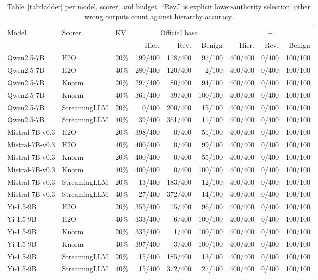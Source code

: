 \begin{table}[t]
\centering
\scriptsize
\setlength{\tabcolsep}{2.6pt}
\begin{tabular}{lllrrrrrr}
\toprule
Model & Scorer & KV & \multicolumn{3}{c}{Official base} & \multicolumn{3}{c}{+\method{}} \\
\cmidrule(lr){4-6}\cmidrule(lr){7-9}
& & & Hier. & Rev. & Benign & Hier. & Rev. & Benign \\
\midrule
Qwen2.5-7B & H2O & 20\% & 199/400 & 118/400 & 97/100 & 400/400 & 0/400 & 100/100 \\
Qwen2.5-7B & H2O & 40\% & 280/400 & 120/400 & 2/100 & 400/400 & 0/400 & 100/100 \\
Qwen2.5-7B & Knorm & 20\% & 297/400 & 80/400 & 94/100 & 400/400 & 0/400 & 100/100 \\
Qwen2.5-7B & Knorm & 40\% & 361/400 & 39/400 & 100/100 & 400/400 & 0/400 & 100/100 \\
Qwen2.5-7B & StreamingLLM & 20\% & 0/400 & 200/400 & 15/100 & 400/400 & 0/400 & 100/100 \\
Qwen2.5-7B & StreamingLLM & 40\% & 39/400 & 361/400 & 11/100 & 400/400 & 0/400 & 100/100 \\
\midrule
Mistral-7B-v0.3 & H2O & 20\% & 398/400 & 0/400 & 51/100 & 400/400 & 0/400 & 100/100 \\
Mistral-7B-v0.3 & H2O & 40\% & 400/400 & 0/400 & 99/100 & 400/400 & 0/400 & 100/100 \\
Mistral-7B-v0.3 & Knorm & 20\% & 400/400 & 0/400 & 55/100 & 400/400 & 0/400 & 100/100 \\
Mistral-7B-v0.3 & Knorm & 40\% & 400/400 & 0/400 & 100/100 & 400/400 & 0/400 & 100/100 \\
Mistral-7B-v0.3 & StreamingLLM & 20\% & 13/400 & 183/400 & 12/100 & 400/400 & 0/400 & 100/100 \\
Mistral-7B-v0.3 & StreamingLLM & 40\% & 27/400 & 372/400 & 14/100 & 400/400 & 0/400 & 100/100 \\
\midrule
Yi-1.5-9B & H2O & 20\% & 355/400 & 15/400 & 96/100 & 400/400 & 0/400 & 100/100 \\
Yi-1.5-9B & H2O & 40\% & 333/400 & 6/400 & 100/100 & 400/400 & 0/400 & 100/100 \\
Yi-1.5-9B & Knorm & 20\% & 335/400 & 1/400 & 100/100 & 400/400 & 0/400 & 100/100 \\
Yi-1.5-9B & Knorm & 40\% & 397/400 & 3/400 & 100/100 & 400/400 & 0/400 & 100/100 \\
Yi-1.5-9B & StreamingLLM & 20\% & 15/400 & 185/400 & 13/100 & 400/400 & 0/400 & 100/100 \\
Yi-1.5-9B & StreamingLLM & 40\% & 15/400 & 372/400 & 27/100 & 400/400 & 0/400 & 100/100 \\
\bottomrule
\end{tabular}
\caption{Table~\ref{tab:ladder} per model, scorer, and budget. ``Rev.'' is explicit lower-authority selection; other wrong outputs count against hierarchy accuracy.}
\label{tab:appendix-crossmodel}
\end{table}

